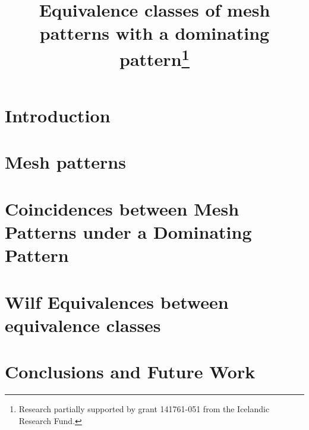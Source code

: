 \documentclass[final, nomarks]{dmtcs-episciences}
\title{Equivalence classes of mesh patterns with a dominating pattern\thanks{Research partially supported by grant 141761-051 from the Icelandic Research Fund.}}
\affiliation{School of Computer Science, Reykjavik University, Reykjavik, Iceland}
\begin{document}
\maketitle

\section{Introduction}

\section{Mesh patterns}

\section{Coincidences between Mesh Patterns under a Dominating Pattern}
\label{sec:coincs}

\section{Wilf Equivalences between equivalence classes}

\section{Conclusions and Future Work}


\printbibliography
\end{document}

